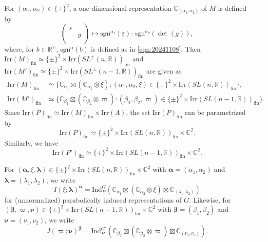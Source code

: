 \documentclass[reqno,11pt]{amsart}
\theoremstyle{remark}
\theoremstyle{definition}
\numberwithin{equation}{section}
\newcommand{\gb}{\beta}
\newcommand{\ga}{\alpha}
\newcommand{\eps}{\varepsilon}
\newcommand{\R}{\mathbb{R}}
\newcommand{\C}{\mathbb{C}}
\newcommand{\Ind}{\mathrm{Ind}}
\newcommand{\Irr}{\mathrm{Irr}}
\newcommand{\fin}{\mathrm{fin}}
\newcommand{\sgn}{\mathrm{sgn}}
\begin{document}
For $(\alpha_1, \alpha_2) \in \{\pm\}^2$,
a one-dimensional representation $\C_{(\alpha_1,\alpha_2)}$ of $M$ 
is defined  by
\begin{equation*}
\begin{pmatrix}
\eps &\\
& g\\
\end{pmatrix}
\longmapsto
\sgn^{\alpha_1}(\eps) \cdot
\sgn^{\alpha_2}(\det(g)),
\end{equation*}
where, for $b\in \R^\times$, $\sgn^\alpha(b)$ is defined as in
\eqref{eqn:20241108}.
Then 
$\Irr(M)_\fin \simeq \{\pm\}^2\times \Irr(SL^{\pm}(n,\R))_\fin$
and
$\Irr(M')_\fin \simeq \{\pm\}^2\times  \Irr(SL^{\pm}(n-1,\R))_\fin$
are given as
\begin{align*}
\Irr(M)_{\fin}&\simeq
\{\C_{\ga_1} \boxtimes (\C_{\alpha_2} \otimes \xi): 
(\alpha_1, \alpha_2, \xi) \in \{\pm\}^2 \times \Irr(SL(n,\R))_{\fin}\},\\
\Irr(M')_{\fin}&\simeq
\{\C_{\beta_1} \boxtimes (\C_{\beta_2} \otimes \varpi): 
(\beta_1, \beta_2, \varpi) \in \{\pm\}^2 \times \Irr(SL(n-1,\R))_{\fin}\}.
\end{align*}
Since 
$\Irr(P)_{\fin}\simeq \Irr(M)_{\fin} \times \Irr(A)$, the set $\Irr(P)_\fin$ can be 
parametrized by
\begin{equation*}
\Irr(P)_{\fin}\simeq 
\{\pm\}^2 \times \Irr(SL(n,\R))_{\fin} \times \C^2.
\end{equation*}
Similarly, we have
\begin{equation*}
\Irr(P')_{\fin}\simeq 
\{\pm\}^2 \times \Irr(SL(n-1,\R))_{\fin} \times \C^2.
\end{equation*}

For 
$(\bm{\ga}, \xi, \bm{\lambda}) \in \{\pm\}^2 \times \Irr(SL(n,\R))_{\fin} \times \C^2$
with $\bm{\ga} = (\ga_1,\ga_2)$ and $\bm{\lambda}=(\lambda_1, \lambda_2)$,
we write
\begin{equation*}
I(\xi;\bm{\lambda})^{\bm{\ga}} 
= 
\Ind_{P}^G\left(\C_{\ga_1}\boxtimes (\C_{\ga_2} \otimes \xi)\boxtimes \C_{(\lambda_1,\lambda_2)}\right)
\end{equation*}
for (unnormalized) parabolically induced representations of $G$.
Likewise,  for
$(\bm{\gb}, \varpi, \bm{\nu}) \in \{\pm\}^2 \times \Irr(SL(n-1,\R))_{\fin} \times \C^2$
with $\bm{\gb} = (\gb_1,\gb_2)$ and $\bm{\nu}=(\nu_1, \nu_2)$, we write
\begin{equation*}
J(\varpi;\bm{\nu})^{\bm{\gb}} 
= 
\Ind_{P'}^{G'}\left(\C_{\gb_1}\boxtimes(\C_{\gb_2} \otimes \varpi)\boxtimes 
\C_{(\nu_1,\nu_2)}\right).
\end{equation*}
\end{document}
